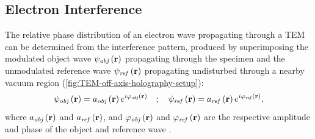 \subsection{Electron Interference} \label{ssec:electron-interference}
The relative phase distribution of an electron wave propagating through a TEM can be determined from the interference pattern, produced by superimposing the modulated object wave $\psi_{\mathit{obj}}\left(\vb{r}\right)$ propagating through the specimen and the unmodulated reference wave $\psi_{\mathit{ref}}\left(\vb{r}\right)$ propagating undisturbed through a nearby vacuum region (\cref{fig:TEM-off-axis-holography-setup}):
\begin{equation}
  \psi_{\mathit{obj}}\left(\vb{r}\right) = a_{\mathit{obj}}\left(\vb{r}\right)e^{i \varphi_{\mathit{obj}}\left(\vb{r}\right)} \quad ; \quad \psi_{\mathit{ref}}\left(\vb{r}\right) = a_{\mathit{ref}}\left(\vb{r}\right)e^{i \varphi_{\mathit{ref}}\left(\vb{r}\right)},
\end{equation}
where $a_{\mathit{obj}}\left(\vb{r}\right)$ and $a_{\mathit{ref}}\left(\vb{r}\right)$, and $\varphi_{\mathit{obj}}\left(\vb{r}\right)$ and $\varphi_{\mathit{ref}}\left(\vb{r}\right)$ are the respective amplitude and phase of the object and reference wave \cite{Voelkl1999,Lehmann2002,Lichte2008}.
